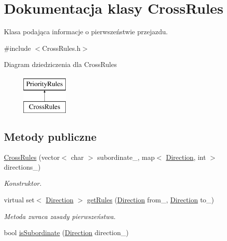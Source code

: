 \hypertarget{class_cross_rules}{\section{Dokumentacja klasy Cross\-Rules}
\label{class_cross_rules}
}


Klasa podająca informacje o pierwszeństwie przejazdu.  




{\ttfamily \#include $<$Cross\-Rules.\-h$>$}

Diagram dziedziczenia dla Cross\-Rules\begin{figure}[H]
\begin{center}
\leavevmode
\includegraphics[height=2.000000cm]{class_cross_rules}
\end{center}
\end{figure}
\subsection*{Metody publiczne}
\begin{DoxyCompactItemize}
\item 
\hyperlink{class_cross_rules_abb95f00b153b70701e01ca5890139c01}{Cross\-Rules} (vector$<$ char $>$ subordinate\-\_\-, map$<$ \hyperlink{_direction_8h_a224b9163917ac32fc95a60d8c1eec3aa}{Direction}, int $>$ directions\-\_\-)
\begin{DoxyCompactList}\small\item\em Konstruktor. \end{DoxyCompactList}\item 
virtual set$<$ \hyperlink{_direction_8h_a224b9163917ac32fc95a60d8c1eec3aa}{Direction} $>$ \hyperlink{class_cross_rules_afc553f8d0a643382b188ebd95faca30f}{get\-Rules} (\hyperlink{_direction_8h_a224b9163917ac32fc95a60d8c1eec3aa}{Direction} from\-\_\-, \hyperlink{_direction_8h_a224b9163917ac32fc95a60d8c1eec3aa}{Direction} to\-\_\-)
\begin{DoxyCompactList}\small\item\em Metoda zwraca zasady pierwszeństwa. \end{DoxyCompactList}\item 
bool \hyperlink{class_cross_rules_aa4799b5462b003f34316a0abf7968d68}{is\-Subordinate} (\hyperlink{_direction_8h_a224b9163917ac32fc95a60d8c1eec3aa}{Direction} direction\-\_\-)
\end{DoxyCompactItemize}
